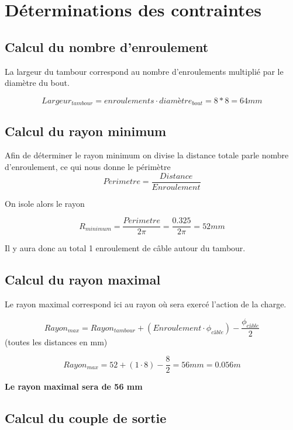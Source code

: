 \section{Déterminations des contraintes}


\subsection{Calcul du nombre d'enroulement}

La largeur du tambour correspond au nombre d'enroulements multiplié par le diamètre du bout.

$$Largeur_{tambour}=enroulements\cdot diamètre_{bout}= 8 * 8 =64 mm$$

\subsection{Calcul du rayon minimum}

Afin de déterminer le rayon minimum on divise la distance totale parle nombre d'enroulement, ce qui nous donne le périmètre \newline
$$Perimetre=\frac{Distance}{Enroulement}$$ 

On isole alors le rayon

$$R_{minimum}= \frac{Perimetre}{2 \pi} = \frac{0.325}{2 \pi}=52mm$$

Il y aura donc au total 1 enroulement de câble autour du tambour. \newline

\subsection{Calcul du rayon maximal}

Le rayon maximal correspond ici au rayon où sera exercé l'action de la charge. \newline

$$Rayon_{max} = Rayon_{tambour} + (Enroulement \cdot \phi_{câble}) - \frac{\phi_{câble}}{2} $$ \newline \newline (toutes les distances en mm) \newline


$$Rayon_{max} = 52 + (1\cdot 8) - \frac{8}{2} = 56 mm = 0.056m$$
\n

\textbf{Le rayon maximal sera de 56 mm
}

\subsection{Calcul du couple de sortie}

